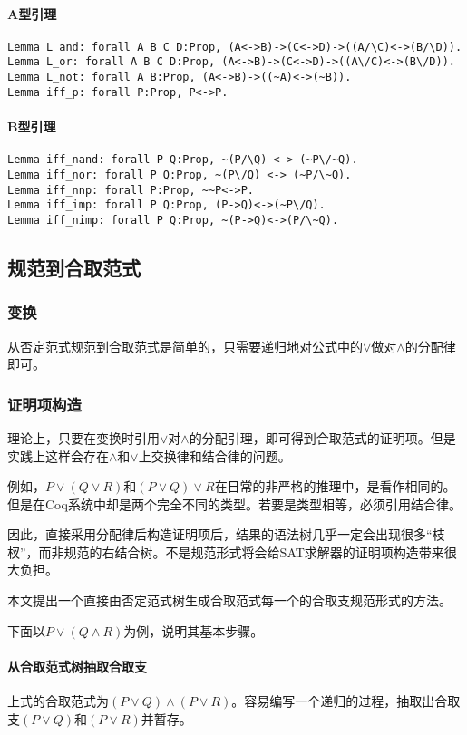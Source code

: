 \paragraph{A型引理}
\begin{verbatim}
Lemma L_and: forall A B C D:Prop, (A<->B)->(C<->D)->((A/\C)<->(B/\D)).
Lemma L_or: forall A B C D:Prop, (A<->B)->(C<->D)->((A\/C)<->(B\/D)).
Lemma L_not: forall A B:Prop, (A<->B)->((~A)<->(~B)).
Lemma iff_p: forall P:Prop, P<->P.
\end{verbatim}

\paragraph{B型引理}
\begin{verbatim}
Lemma iff_nand: forall P Q:Prop, ~(P/\Q) <-> (~P\/~Q).
Lemma iff_nor: forall P Q:Prop, ~(P\/Q) <-> (~P/\~Q).
Lemma iff_nnp: forall P:Prop, ~~P<->P.
Lemma iff_imp: forall P Q:Prop, (P->Q)<->(~P\/Q).
Lemma iff_nimp: forall P Q:Prop, ~(P->Q)<->(P/\~Q).
\end{verbatim}

\subsection{规范到合取范式}
\subsubsection{变换}
从否定范式规范到合取范式是简单的，只需要递归地对公式中的$\lor$做对$\land$的分配律即可。

\subsubsection{证明项构造}
理论上，只要在变换时引用$\lor$对$\land$的分配引理，即可得到合取范式的证明项。但是实践上这样会存在$\land$和$\lor$上交换律和结合律的问题。

例如，$P \lor (Q \lor R)$和$(P \lor Q) \lor R$在日常的非严格的推理中，是看作相同的。但是在Coq系统中却是两个完全不同的类型。若要是类型相等，必须引用结合律。

因此，直接采用分配律后构造证明项后，结果的语法树几乎一定会出现很多“枝杈”，而非规范的右结合树。不是规范形式将会给SAT求解器的证明项构造带来很大负担。

本文提出一个直接由否定范式树生成合取范式每一个的合取支规范形式的方法。

下面以$P \lor (Q \land R)$为例，说明其基本步骤。

\paragraph{从合取范式树抽取合取支}
上式的合取范式为$(P \lor Q) \land (P \lor R)$。容易编写一个递归的过程，抽取出合取支$(P \lor Q)$和$(P \lor R)$并暂存。

